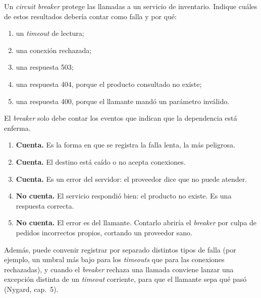 \documentclass[variant=guia,cover=institutional,mode=screen]{ua-engineering-v6-article}
\begin{document}
\begin{uaexercise}
Un \emph{circuit breaker} protege las llamadas a un servicio de inventario. Indique cuáles de estos resultados debería contar como falla y por qué:
\begin{enumerate}
\item un \emph{timeout} de lectura;
\item una conexión rechazada;
\item una respuesta 503;
\item una respuesta 404, porque el producto consultado no existe;
\item una respuesta 400, porque el llamante mandó un parámetro inválido.
\end{enumerate}
\end{uaexercise}
\begin{uaanswer}
El \emph{breaker} solo debe contar los eventos que indican que la dependencia está enferma.
\begin{enumerate}
\item \textbf{Cuenta.} Es la forma en que se registra la falla lenta, la más peligrosa.
\item \textbf{Cuenta.} El destino está caído o no acepta conexiones.
\item \textbf{Cuenta.} Es un error del servidor: el proveedor dice que no puede atender.
\item \textbf{No cuenta.} El servicio respondió bien: el producto no existe. Es una respuesta correcta.
\item \textbf{No cuenta.} El error es del llamante. Contarlo abriría el \emph{breaker} por culpa de pedidos incorrectos propios, cortando un proveedor sano.
\end{enumerate}
Además, puede convenir registrar por separado distintos tipos de falla (por ejemplo, un umbral más bajo para los \emph{timeouts} que para las conexiones rechazadas), y cuando el \emph{breaker} rechaza una llamada conviene lanzar una excepción distinta de un \emph{timeout} corriente, para que el llamante sepa qué pasó (Nygard, cap.~5).
\end{uaanswer}
\end{document}
